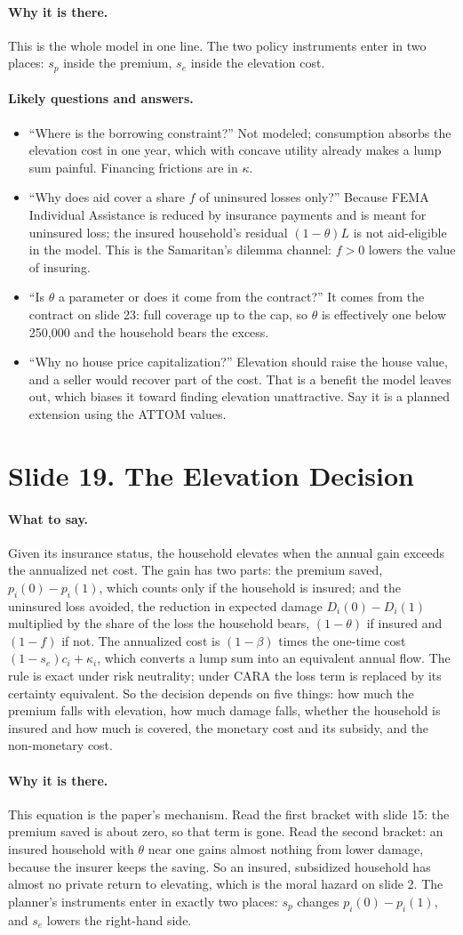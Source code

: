 \documentclass[11pt]{article}
\newcommand{\slide}[2]{\section*{Slide #1. #2}\addcontentsline{toc}{section}{Slide #1. #2}}
\newcommand{\say}{\paragraph{What to say.}}
\newcommand{\why}{\paragraph{Why it is there.}}
\newcommand{\qa}{\paragraph{Likely questions and answers.}}
\begin{document}
\why This is the whole model in one line. The two policy instruments enter in two places: $s_p$ inside the premium, $s_e$ inside the elevation cost.

\qa
\begin{itemize}
\item ``Where is the borrowing constraint?'' Not modeled; consumption absorbs the elevation cost in one year, which with concave utility already makes a lump sum painful. Financing frictions are in $\kappa$.
\item ``Why does aid cover a share $f$ of uninsured losses only?'' Because FEMA Individual Assistance is reduced by insurance payments and is meant for uninsured loss; the insured household's residual $(1-\theta)L$ is not aid-eligible in the model. This is the Samaritan's dilemma channel: $f > 0$ lowers the value of insuring.
\item ``Is $\theta$ a parameter or does it come from the contract?'' It comes from the contract on slide 23: full coverage up to the cap, so $\theta$ is effectively one below 250,000 and the household bears the excess.
\item ``Why no house price capitalization?'' Elevation should raise the house value, and a seller would recover part of the cost. That is a benefit the model leaves out, which biases it toward finding elevation unattractive. Say it is a planned extension using the ATTOM values.
\end{itemize}

\slide{19}{The Elevation Decision}
\say Given its insurance status, the household elevates when the annual gain exceeds the annualized net cost. The gain has two parts: the premium saved, $p_i(0)-p_i(1)$, which counts only if the household is insured; and the uninsured loss avoided, the reduction in expected damage $D_i(0)-D_i(1)$ multiplied by the share of the loss the household bears, $(1-\theta)$ if insured and $(1-f)$ if not. The annualized cost is $(1-\beta)$ times the one-time cost $(1-s_e)c_i + \kappa_i$, which converts a lump sum into an equivalent annual flow. The rule is exact under risk neutrality; under CARA the loss term is replaced by its certainty equivalent. So the decision depends on five things: how much the premium falls with elevation, how much damage falls, whether the household is insured and how much is covered, the monetary cost and its subsidy, and the non-monetary cost.

\why This equation is the paper's mechanism. Read the first bracket with slide 15: the premium saved is about zero, so that term is gone. Read the second bracket: an insured household with $\theta$ near one gains almost nothing from lower damage, because the insurer keeps the saving. So an insured, subsidized household has almost no private return to elevating, which is the moral hazard on slide 2. The planner's instruments enter in exactly two places: $s_p$ changes $p_i(0)-p_i(1)$, and $s_e$ lowers the right-hand side.
\end{document}
